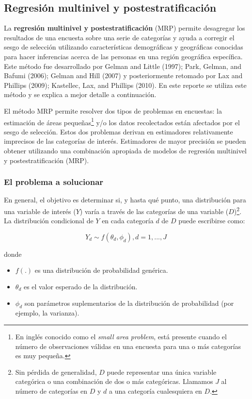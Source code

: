 \documentclass[]{article}
\let\rmarkdownfootnote\footnote%
\def\footnote{\protect\rmarkdownfootnote}
\begin{document}
\subsection{Regresión multinivel y
postestratificación}\label{regresion-multinivel-y-postestratificacion-1}

La \textbf{regresión multinivel y postestratificación} (MRP) permite
desagregar los resultados de una encuesta sobre una serie de categorías
y ayuda a corregir el sesgo de selección utilizando características
demográficas y geográficas conocidas para hacer inferencias acerca de
las personas en una región geográfica específica. Este método fue
desarrollado por Gelman and Little (1997); Park, Gelman, and Bafumi
(2006); Gelman and Hill (2007) y posteriormente retomado por Lax and
Phillips (2009); Kastellec, Lax, and Phillips (2010). En este reporte se
utiliza este método y se explica a mejor detalle a continuación.

El método MRP permite resolver dos tipos de problemas en encuestas: la
estimación de áreas pequeñas\footnote{En inglés conocido como el
  \emph{small area problem}, está presente cuando el número de
  observaciones válidas en una encuesta para una o más categorías es muy
  pequeña.} y/o los datos recolectados están afectados por el sesgo de
selección. Estos dos problemas derivan en estimadores relativamente
imprecisos de las categorías de interés. Estimadores de mayor precisión
se pueden obtener utilizando una combinación apropiada de modelos de
regresión multinivel y postestratificación (MRP).

\subsubsection{El problema a solucionar}\label{el-problema-a-solucionar}

En general, el objetivo es determinar si, y hasta qué punto, una
distribución para una variable de interés ($Y$) varía a través de las
categorías de una variable ($D$)\footnote{Sin pérdida de generalidad,
  $D$ puede representar una única variable categórica o una combinación
  de dos o más categóricas. Llamamos $J$ al número de categorías en $D$
  y $d$ a una categoría cualesquiera en $D$.}. La distribución
condicional de $Y$ en cada categoría $d$ de $D$ puede escribirse como:

\[
Y_d \sim f(\theta_d, \phi_d), d = 1, ..., J
\]

donde

\begin{itemize}
\itemsep1pt\parskip0pt
\item
  $f(.)$ es una distribución de probabilidad genérica.
\item
  $\theta_d$ es el valor esperado de la distribución.
\item
  $\phi_d$ son parámetros suplementarios de la distribución de
  probabilidad (por ejemplo, la varianza).
\end{itemize}
\end{document}
